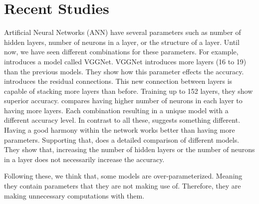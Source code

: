 \section{Recent Studies}
Artificial Neural Networks (ANN) have several parameters such as number of hidden layers, number of neurons in a layer, or the structure of a layer. Until now, we have seen different combinations for these parameters. For example, \cite{Simonyan:2014aa} introduces a model called VGGNet. VGGNet introduces more layers (16 to 19) than the previous models. They show how this parameter effects the accuracy. \cite{He:2015aa} introduces the residual connections. This new connection between layers is capable of stacking more layers than before. Training up to 152 layers, they show superior accuracy. \cite{Zagoruyko:2016aa} compares having higher number of neurons in each layer to having more layers. Each combination resulting in a unique model with a different accuracy level. In contrast to all these, \cite{Szegedy:2014aa} suggests something different. Having a good harmony within the network works better than having more parameters. Supporting that, \cite{Canziani:2016aa} does a detailed comparison of different models. They show that, increasing the number of hidden layers or the number of neurons in a layer does not necessarily increase the accuracy. 

Following these, we think that, some models are over-parameterized. Meaning they contain parameters that they are not making use of. Therefore, they are making unnecessary computations with them.


